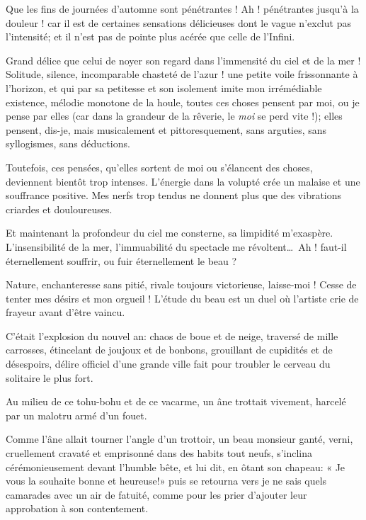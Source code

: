 Que les fins de journées d’automne sont pénétrantes !
Ah ! pénétrantes jusqu’à la douleur ! car il est de
certaines sensations délicieuses dont le vague
n’exclut pas l’intensité; et il
n’est pas de pointe plus acérée que celle de
l’Infini.

Grand délice que celui de noyer son regard dans
l’immensité du ciel et de la mer ! Solitude, silence,
incomparable chasteté de l’azur ! une petite voile
frissonnante à l’horizon, et qui par sa petitesse et
son isolement imite mon irrémédiable existence, mélodie monotone de la
houle, toutes ces choses pensent par moi, ou je pense par elles (car
dans la grandeur de la rêverie, le \textit{moi} se perd vite !); elles pensent,
dis{}-je, mais musicalement et pittoresquement, sans arguties, sans
syllogismes, sans déductions.

Toutefois, ces pensées, qu’elles sortent de moi ou
s’élancent des choses, deviennent bientôt trop
intenses. L’énergie dans la volupté crée un malaise et
une souffrance positive. Mes nerfs trop tendus ne donnent plus que des
vibrations criardes et douloureuses.

Et maintenant la profondeur du ciel me consterne, sa limpidité
m’exaspère. L’insensibilité de la
mer, l’immuabilité du spectacle me révoltent\ldots\ Ah !
faut{}-il éternellement souffrir, ou fuir éternellement le beau ?

Nature, enchanteresse sans pitié, rivale toujours victorieuse,
laisse{}-moi ! Cesse de tenter mes désirs et mon orgueil !
L’étude du beau est un duel où
l’artiste crie de frayeur avant
d’être vaincu.


C’était l’explosion du nouvel an:
chaos de boue et de neige, traversé de mille carrosses, étincelant de
joujoux et de bonbons, grouillant de cupidités et de désespoirs, délire
officiel d’une grande ville fait pour troubler le
cerveau du solitaire le plus fort.

Au milieu de ce tohu{}-bohu et de ce vacarme, un âne trottait vivement,
harcelé par un malotru armé d’un fouet.

Comme l’âne allait tourner l’angle
d’un trottoir, un beau monsieur ganté, verni,
cruellement cravaté et emprisonné dans des habits tout neufs,
s’inclina cérémonieusement devant
l’humble bête, et lui dit, en ôtant son chapeau: « Je
vous la souhaite bonne et heureuse!» puis se retourna vers je ne sais
quels camarades avec un air de fatuité, comme pour les prier
d’ajouter leur approbation à son contentement.

